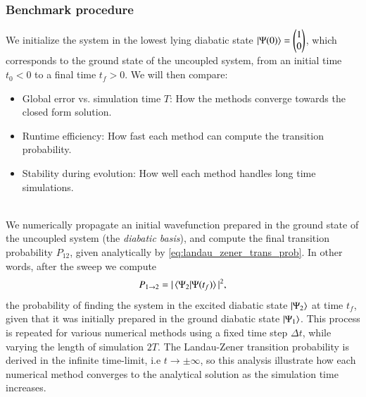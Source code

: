 \documentclass{subfiles}
\begin{document}
\subsubsection*{Benchmark procedure}
We initialize the system in the lowest lying diabatic state $\ket{\Psi(0)} = \begin{pmatrix} 1 \\ 0 \end{pmatrix}$, which corresponds to the ground state of the uncoupled system, from an initial time $t_0<0$ to a final time $t_f>0$. We will then compare:
\begin{itemize}
    \item Global error vs. simulation time $T$: How the methods converge towards the closed form solution.
    \item Runtime efficiency: How fast each method can compute the transition probability.
    \item Stability during evolution: How well each method handles long time simulations. 
\end{itemize}
\\ 
We numerically propagate an initial wavefunction prepared in the ground state of the uncoupled system (the \emph{diabatic basis}), and compute the final transition probability $P_{12}$, given analytically by \eqref{eq:landau_zener_trans_prob}. In other words, after the sweep we compute 
\begin{align*}
    P_{1\to2} = |\braket{\Psi_2|\Psi(t_f)}|^2,
\end{align*}
the probability of finding the system in the excited diabatic state $\ket{\Psi_2}$ at time $t_f$, given that it was initially prepared in the ground diabatic state $\ket{\Psi_1}$. This process is repeated for various numerical methods using a fixed time step $\Delta t$, while varying the length of simulation $2T$. The Landau-Zener transition probability is derived in the infinite time-limit, i.e $t\rightarrow \pm \infty$, so this analysis illustrate how each numerical method converges to the analytical solution as the simulation time increases.
\end{document}
